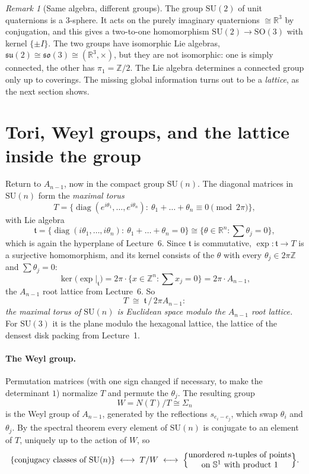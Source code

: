 \documentclass[11pt,openany]{book}
\theoremstyle{plain}
\theoremstyle{definition}
\theoremstyle{remark}
\newtheorem{remark}[theorem]{Remark}
\newcommand{\R}{\mathbb{R}}
\newcommand{\Z}{\mathbb{Z}}
\newcommand{\Sph}{\mathbb{S}}          %
\newcommand{\SO}{\mathrm{SO}}
\begin{document}
\begin{remark}[Same algebra, different groups]
The group $\mathrm{SU}(2)$ of unit quaternions is a $3$-sphere. It acts on the purely imaginary
quaternions $\cong\R^3$ by conjugation, and this gives a two-to-one homomorphism
$\mathrm{SU}(2)\to\SO(3)$ with kernel $\{\pm I\}$. The two groups have isomorphic Lie algebras,
$\mathfrak{su}(2)\cong\mathfrak{so}(3)\cong(\R^3,\times)$, but they are not isomorphic: one is simply connected,
the other has $\pi_1=\Z/2$. The Lie algebra determines a connected group only up to coverings. The
missing global information turns out to be a \emph{lattice}, as the next section shows.
\end{remark}

\section{Tori, Weyl groups, and the lattice inside the group}
\label{LIE:sec:torus}

Return to $A_{n-1}$, now in the compact group $\mathrm{SU}(n)$. The diagonal matrices in $\mathrm{SU}(n)$ form
the \emph{maximal torus}
\[
  T=\big\{\operatorname{diag}(e^{i\theta_1},\dots,e^{i\theta_n}):\ \theta_1+\dots+\theta_n\equiv0\pmod{2\pi}\big\},
\]
with Lie algebra
\[
  \mathfrak t=\{\operatorname{diag}(i\theta_1,\dots,i\theta_n):\ \theta_1+\dots+\theta_n=0\}
  \cong\{\theta\in\R^n:\textstyle\sum\theta_j=0\},
\]
which is again the hyperplane of Lecture~6. Since $\mathfrak t$ is commutative, $\exp\colon\mathfrak t\to T$ is a
surjective homomorphism, and its kernel consists of the $\theta$ with every $\theta_j\in2\pi\Z$ and
$\sum\theta_j=0$:
\[
  \ker\big(\exp|_{\mathfrak t}\big)=2\pi\cdot\{x\in\Z^n:\textstyle\sum x_j=0\}=2\pi\cdot A_{n-1},
\]
the $A_{n-1}$ root lattice from Lecture~6. So
\[
  T\;\cong\;\mathfrak t\,/\,2\pi A_{n-1}:
\]
\emph{the maximal torus of $\mathrm{SU}(n)$ is Euclidean space modulo the $A_{n-1}$ root lattice.} For
$\mathrm{SU}(3)$ it is the plane modulo the hexagonal lattice, the lattice of the densest disk packing
from Lecture~1.

\paragraph{The Weyl group.} Permutation matrices (with one sign changed if necessary, to make the
determinant $1$) normalize $T$ and permute the $\theta_j$. The resulting group
\[
  W=N(T)/T\cong\Sigma_n
\]
is the Weyl group of $A_{n-1}$, generated by the reflections $s_{e_i-e_j}$, which swap $\theta_i$ and
$\theta_j$. By the spectral theorem every element of $\mathrm{SU}(n)$ is conjugate to an element of $T$,
uniquely up to the action of $W$, so
\[
  \{\text{conjugacy classes of }\mathrm{SU}(n)\}\;\longleftrightarrow\;T/W
  \;\longleftrightarrow\;\Big\{\begin{array}{@{}c@{}}\text{unordered $n$-tuples of points}\\
  \text{on }\Sph^1\text{ with product }1\end{array}\Big\}.
\]
\end{document}
